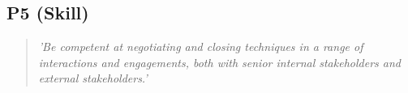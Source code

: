 \subsection{P5 (Skill)}

  \begin{quote}
    \textit{'Be competent at negotiating and closing
    techniques in a range of interactions and engagements,
    both with senior internal stakeholders and external
    stakeholders.'}
  \end{quote}

\newpage